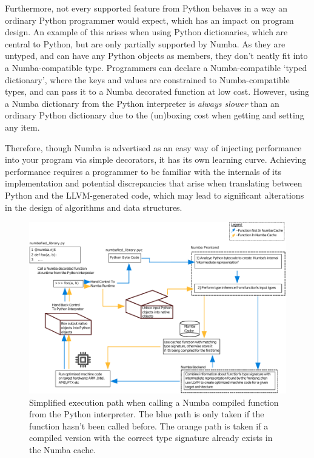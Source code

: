 \documentclass{IEEEcsmag}
\begin{document}
Furthermore, not every supported feature from Python behaves in a way an ordinary Python programmer would expect, which has an impact on program design. An example of this arises when using Python dictionaries, which are central to Python, but are only partially supported by Numba. As they are untyped, and can have any Python objects as members, they don't neatly fit into a Numba-compatible type. Programmers can declare a Numba-compatible `typed dictionary', where the keys and values are constrained to Numba-compatible types, and can pass it to a Numba decorated function at low cost. However, using a Numba dictionary from the Python interpreter is \textit{always slower} than an ordinary Python dictionary due to the (un)boxing cost when getting and setting any item.

Therefore, though Numba is advertised as an easy way of injecting performance into your program via simple decorators, it has its own learning curve. Achieving performance requires a programmer to be familiar with the internals of its implementation and potential discrepancies that arise when translating between Python and the LLVM-generated code, which may lead to significant alterations in the design of algorithms and data structures. 

\begin{figure}
    \centerline{\includegraphics {figures/numba.pdf}}
    \caption{Simplified execution path when calling a Numba compiled function from the Python interpreter. The blue path is only taken if the function hasn't been called before. The orange path is taken if a compiled version with the correct type signature already exists in the Numba cache.}
    \label{fig:numba}
\end{figure}
\end{document}
